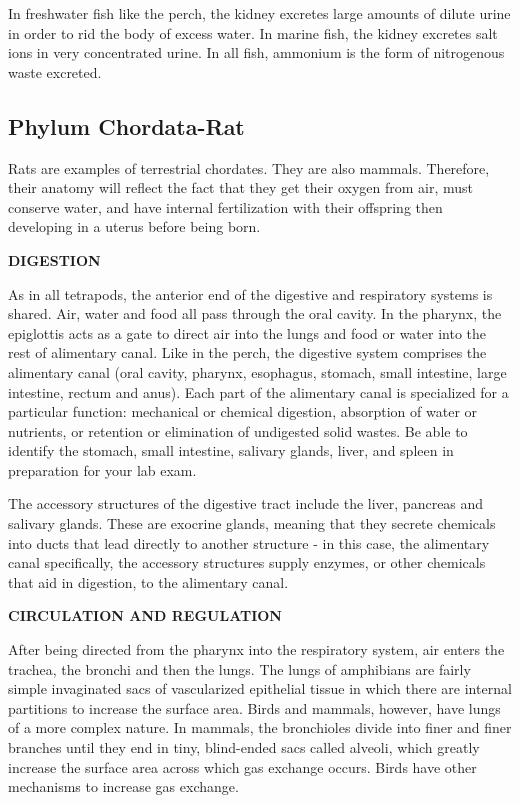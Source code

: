 \documentclass[
]{book}
\begin{document}
In freshwater fish like the perch, the kidney excretes large amounts of dilute urine in order to rid the body of excess water. In marine fish, the kidney excretes salt ions in very concentrated urine.
In all fish, ammonium is the form of nitrogenous waste excreted.

\hypertarget{phylum-chordata-rat}{%
\subsection*{Phylum Chordata-Rat}\label{phylum-chordata-rat}}

Rats are examples of terrestrial chordates. They are also mammals. Therefore, their anatomy will reflect the fact that they get their oxygen from air, must conserve water, and have internal fertilization with their offspring then developing in a uterus before being born.

\textbf{DIGESTION}

As in all tetrapods, the anterior end of the digestive and respiratory systems is shared. Air, water and food all pass through the oral cavity. In the pharynx, the epiglottis acts as a gate to direct air into the lungs and food or water into the rest of alimentary canal. Like in the perch, the digestive
system comprises the alimentary canal (oral cavity, pharynx, esophagus, stomach, small intestine, large intestine, rectum and anus). Each part of the alimentary canal is specialized for a particular function: mechanical or chemical digestion, absorption of water or nutrients, or retention or elimination of undigested solid wastes. Be able to identify the stomach, small intestine, salivary glands, liver, and spleen in preparation for your lab exam.

The accessory structures of the digestive tract include the liver, pancreas and salivary glands. These are exocrine glands, meaning that they secrete chemicals into ducts that lead directly to another structure - in this case, the alimentary canal specifically, the accessory structures supply enzymes, or other chemicals that aid in digestion, to the alimentary canal.

\textbf{CIRCULATION AND REGULATION}

After being directed from the pharynx into the respiratory system, air enters the trachea, the bronchi and then the lungs. The lungs of amphibians are fairly simple invaginated sacs of vascularized epithelial tissue in which there are internal partitions to increase the surface area. Birds and mammals, however, have lungs of a more complex nature. In mammals, the bronchioles divide into finer and finer branches until they end in tiny, blind-ended sacs called alveoli, which greatly increase the surface area across which gas exchange occurs. Birds have
other mechanisms to increase gas exchange.
\end{document}

